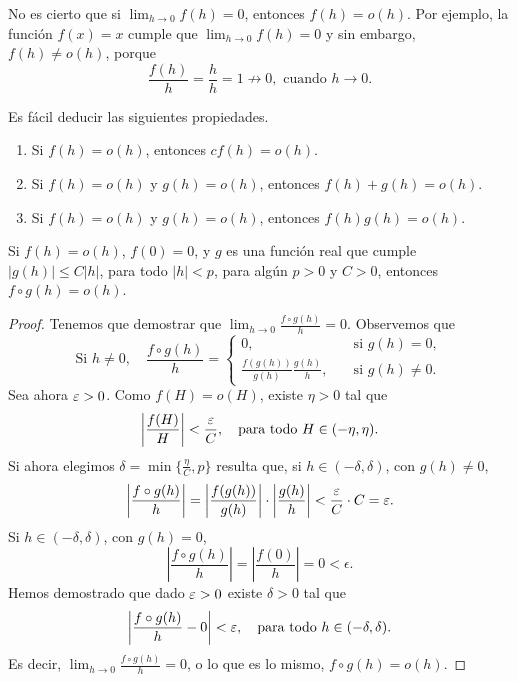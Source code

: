 \begin{remark}
    No es cierto que si $\lim_{h\to0}f(h) = 0$, entonces $f(h) = o(h)$.
    Por ejemplo, la función $f(x) = x$ cumple que $\lim_{h\to0}f(h) = 0$ y sin embargo, $f(h) \neq o(h)$, porque
    \[
    \frac{f(h)}{h} = \frac hh = 1 \not\to 0, \text{ cuando $h\to 0$}.
    \]
\end{remark}


Es fácil deducir las siguientes propiedades.

\begin{theorem}[Propiedades]
    \begin{enumerate}[{\bf(a)}]
        \item Si $f(h)=o(h)$, entonces $cf(h) = o(h)$.
        \item Si $f(h)=o(h)$ y $g(h) = o(h)$, entonces $f(h)+g(h) = o(h)$.
        \item Si $f(h)=o(h)$ y $g(h) = o(h)$, entonces $f(h)g(h) = o(h)$.
    \end{enumerate}
\end{theorem}


\begin{theorem}
Si $f(h)=o(h)$, $f(0)=0$, y $g$ es una función real que cumple
$|g(h)| \le C|h|$, para todo $|h|<p$, para algún $p>0$ y $C>0$, entonces $f\circ g(h) = o(h)$.
\end{theorem}

\begin{proof}
    Tenemos que demostrar que $\lim_{h\to0} \frac{f\circ g(h)}{h} = 0$.
    Observemos que
    \[
    \text{Si $h \neq 0$}, \quad
    \frac{f\circ g(h)}{h} = \begin{cases}
        0,\quad&\text{si }g(h) = 0,\\
        \frac{f(g(h))}{g(h)} \frac{g(h)}{h}, \quad&\text{si }g(h) \neq 0.
    \end{cases}
    \]
    Sea ahora $\varepsilon > 0$. Como $f(H)=o(H)$, existe $\eta > 0$ tal que
    \[
    \left| \frac{f(H)}{H} \right| < \frac{\varepsilon}{C}, \quad\text{para todo } H \in (-\eta,\eta) .
    \]
    Si ahora elegimos $\delta = \min\Big\{\frac\eta C,p\Big\}$ resulta que, si  $h\in(-\delta,\delta)$, con $g(h)\neq0$,
    \[
    \left| \frac{f\circ g(h)}{h} \right|
    = \left| \frac{f(g(h))}{g(h)} \right|\cdot \left|\frac{g(h)}{h} \right|
    < \frac{\varepsilon}C \cdot C = \varepsilon.
    \]
    Si $h\in(-\delta,\delta)$, con $g(h)=0$,
    \[
        \left| \frac{f\circ g(h)}{h} \right|=
        \left| \frac{f(0)}{h} \right| = 0 < \epsilon.
    \]
    Hemos demostrado que dado $\varepsilon > 0$ existe $\delta > 0$ tal que
    \[
    \left| \frac{f\circ g(h)}{h} - 0 \right| < \varepsilon, \quad\text{para todo }h \in (-\delta,\delta).
    \]
    Es decir, $\lim_{h \to 0} \frac{f\circ g(h)}{h} = 0$, o lo que es lo mismo, $f\circ g(h) = o(h)$.
\end{proof}


